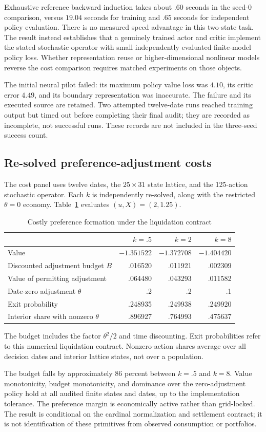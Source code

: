 Exhaustive reference backward induction takes about $.60$ seconds in the seed-0 comparison, versus $19.04$ seconds for training and $.65$ seconds for independent policy evaluation. There is no measured speed advantage in this two-state task. The result instead establishes that a genuinely trained actor and critic implement the stated stochastic operator with small independently evaluated finite-model policy loss. Whether representation reuse or higher-dimensional nonlinear models reverse the cost comparison requires matched experiments on those objects.

The initial neural pilot failed: its maximum policy value loss was $4.10$, its critic error $4.49$, and its boundary representation was inaccurate. The failure and its executed source are retained. Two attempted twelve-date runs reached training output but timed out before completing their final audit; they are recorded as incomplete, not successful runs. These records are not included in the three-seed success count.

\subsection{Re-solved preference-adjustment costs}
The cost panel uses twelve dates, the $25\times31$ state lattice, and the 125-action stochastic operator. Each $k$ is independently re-solved, along with the restricted $\theta=0$ economy. Table~\ref{tab:cost} evaluates $(u,X)=(2,1.25)$.
\begin{table}[ht]
\centering
\caption{Costly preference formation under the liquidation contract}
\label{tab:cost}
\begin{tabular}{lrrr}
\toprule
 & $k=.5$ & $k=2$ & $k=8$\\
\midrule
Value & $-1.351522$ & $-1.372708$ & $-1.404420$\\
Discounted adjustment budget $B$ & .016520 & .011921 & .002309\\
Value of permitting adjustment & .064480 & .043293 & .011582\\
Date-zero adjustment $\theta$ & .2 & .2 & .1\\
Exit probability & .248935 & .249938 & .249920\\
Interior share with nonzero $\theta$ & .896927 & .764993 & .475637\\
\bottomrule
\end{tabular}
\par\smallskip\footnotesize The budget includes the factor $\theta^2/2$ and time discounting. Exit probabilities refer to this numerical liquidation contract. Nonzero-action shares average over all decision dates and interior lattice states, not over a population.
\end{table}
The budget falls by approximately 86 percent between $k=.5$ and $k=8$. Value monotonicity, budget monotonicity, and dominance over the zero-adjustment policy hold at all audited finite states and dates, up to the implementation tolerance. The preference margin is economically active rather than grid-locked. The result is conditional on the cardinal normalization and settlement contract; it is not identification of these primitives from observed consumption or portfolios.

